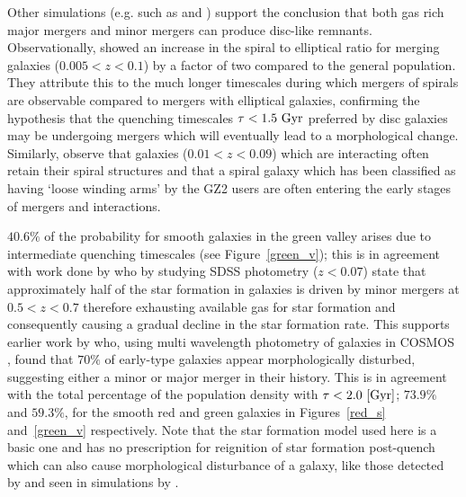 Other simulations (e.g. such as \citet{robertson06} and \citet{Barnes02}) support the conclusion that both gas rich major mergers and minor mergers can produce disc-like remnants. Observationally, \citet{Darg10a} showed an increase in the spiral to elliptical ratio for merging galaxies ($0.005 < z < 0.1$) by a factor of two compared to the general population. They attribute this to the much longer timescales during which mergers of spirals are observable compared to mergers with elliptical galaxies, confirming the hypothesis that the quenching timescales $\tau < 1.5 ~\rm{Gyr}$ preferred by disc galaxies may be undergoing mergers which will eventually lead to a morphological change. Similarly, \citet{Casteels13} observe that galaxies ($0.01 < z < 0.09$) which are interacting often retain their spiral structures and that a spiral galaxy which has been classified as having `loose winding arms' by the GZ2 users are often entering the early stages of mergers and interactions.

$40.6\%$ of the probability for smooth galaxies in the green valley arises due to intermediate quenching timescales (see Figure~\ref{green_v}); this is in agreement with work done by \citet{kaviraj14a, kaviraj14b} who by studying SDSS photometry ($z<0.07$) state that approximately half of the star formation in galaxies is driven by minor mergers at $0.5 < z < 0.7$ therefore exhausting available gas for star formation and consequently causing a gradual decline in the star formation rate. This supports earlier work by \cite{kaviraj11} who, using multi wavelength photometry of galaxies in COSMOS \citep{Scoville07}, found that $70\%$ of early-type galaxies appear morphologically disturbed, suggesting either a minor or major merger in their history. This is in agreement with the total percentage of the population density with $\tau < 2.0 ~\rm[Gyr]$; $73.9\%$ and $59.3\%$, for the smooth red and green galaxies in Figures~\ref{red_s} and~\ref{green_v} respectively. Note that the star formation model used here is a basic one and has no prescription for reignition of star formation post-quench which can also cause morphological disturbance of a galaxy, like those detected by \cite{kaviraj11} and seen in simulations by \cite{pontzen16}.

